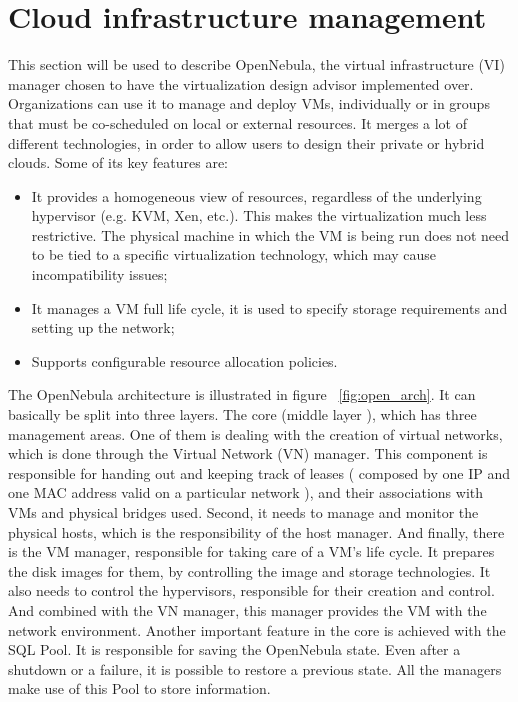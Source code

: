 \chapter{\textbf{Cloud infrastructure management}}
\label{chap:infrastructure}

This section will be used to describe OpenNebula, the virtual infrastructure (VI) manager chosen to have the virtualization design advisor implemented over. Organizations can use it to manage and deploy VMs, individually or in groups that must be co-scheduled on local or external resources. It merges a lot of different technologies, in order to allow users to design their private or hybrid clouds. Some of its key features are:
\begin{itemize}
 \item It provides a homogeneous view of resources, regardless of the underlying hypervisor (e.g. KVM, Xen, etc.). This makes the virtualization much less restrictive. The physical machine in which the VM is being run does not need to be tied to a specific virtualization technology, which may cause incompatibility issues;
  \item It manages a VM full life cycle, it is used to specify storage requirements and setting up the network;
  \item Supports configurable resource allocation policies.
\end{itemize}

The OpenNebula architecture is illustrated in figure ~\ref{fig:open_arch}. It can basically be split into three layers. The core (middle layer ), which has three management areas. One of them is dealing with the creation of virtual networks, which is done through the Virtual Network (VN) manager. This component is responsible for handing out and keeping track of leases ( composed by one IP and one MAC address valid on a particular network ), and their associations with VMs and physical bridges used. Second, it needs to manage and monitor the physical hosts, which is the responsibility of the host manager. And finally, there is the VM manager, responsible for taking care of a VM's life cycle. It prepares the disk images for them, by controlling the image and storage technologies. It also needs to control the hypervisors, responsible for their creation and control. And combined with the VN manager, this manager provides the VM with the network environment. Another important feature in the core is achieved with 
the SQL Pool. It is responsible for saving the OpenNebula state. Even after a shutdown or a failure, it is possible to restore a previous state. All the managers make use of this Pool to store information.


